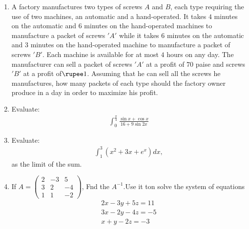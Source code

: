\documentclass[10pt,-letter paper]{article}
\providecommand{\brak}[1]{\ensuremath{\left(#1\right)}}
\newcommand{\myvec}[1]{\ensuremath{\begin{pmatrix}#1\end{pmatrix}}}
\begin{document}
\begin{enumerate}
\item A factory manufactures two types of screws $A$ and $B$, each type requiring the use of two machines, an automatic and a hand-operated. It takes $4$ minutes on the automatic and $6$ minutes on the hand-operated machines to manufacture a packet of screws $'A'$ while it takes $6$ minutes on the automatic and $3$ minutes on the hand-operated machine to manufacture a packet of screws $'B'$. Each machine is available for at most $4$ hours on any day. The manufacturer can sell a packet of screws $'A'$ at a profit of $70$ paise and screws $'B'$ at a profit of$\rupee 1$. Assuming that he can sell all the screws he manufactures, how many packets of each type should the factory owner produce in a day in order to maximize his profit.

\item Evaluate:
	\begin{align*}
	\int_{0}^{\frac{\pi}{4}}\frac{\sin x+\cos x}{16+9 \sin 2x}
	\end{align*}

\item Evaluate: 
\begin{align*}
\int_{1}^{3} \brak{x^{2}+3x+e^{x}}dx,
\end{align*}
	as the limit of the sum.

\item If $A=\myvec{2 & -3 & 5 \\ 3 & 2 & -4 \\ 1 & 1 & -2}$, Fnd the $A^{-1}$.Use it ton solve the system of equations 
\begin{align*}
		2x-3y+5z=11 \\
		3x-2y-4z=-5\\
		x+y-2z=-3
\end{align*}

\end{enumerate}
\end{document}

